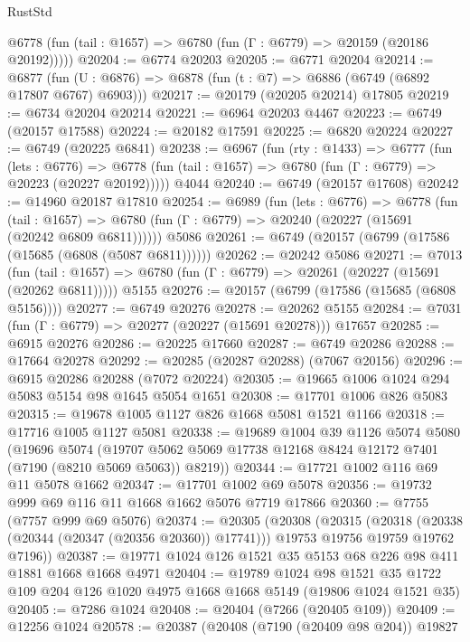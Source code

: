 \begin{lexlean}{RustStd}
\begin{coremodule}
      @6778 (fun (tail : @1657) => @6780 (fun (Γ : @6779) => @20159 (@20186 @20192)))))
@20204 := @6774 @20203
@20205 := @6771 @20204
@20214 := @6877
    (fun (U : @6876) => @6878 (fun (t : @7) => @6886 (@6749 (@6892 @17807 @6767) @6903)))
@20217 := @20179 (@20205 @20214) @17805
@20219 := @6734 @20204 @20214
@20221 := @6964 @20203 @4467
@20223 := @6749 (@20157 @17588)
@20224 := @20182 @17591
@20225 := @6820 @20224
@20227 := @6749 (@20225 @6841)
@20238 := @6967
    (fun (rty : @1433) =>
    @6777
      (fun (lets : @6776) =>
      @6778 (fun (tail : @1657) => @6780 (fun (Γ : @6779) => @20223 (@20227 @20192)))))
    @4044
@20240 := @6749 (@20157 @17608)
@20242 := @14960 @20187 @17810
@20254 := @6989
    (fun (lets : @6776) =>
    @6778
      (fun (tail : @1657) =>
      @6780 (fun (Γ : @6779) => @20240 (@20227 (@15691 (@20242 @6809 @6811))))))
    @5086
@20261 := @6749 (@20157 (@6799 (@17586 (@15685 (@6808 (@5087 @6811))))))
@20262 := @20242 @5086
@20271 := @7013
    (fun (tail : @1657) => @6780 (fun (Γ : @6779) => @20261 (@20227 (@15691 (@20262 @6811)))))
    @5155
@20276 := @20157 (@6799 (@17586 (@15685 (@6808 @5156))))
@20277 := @6749 @20276
@20278 := @20262 @5155
@20284 := @7031 (fun (Γ : @6779) => @20277 (@20227 (@15691 @20278))) @17657
@20285 := @6915 @20276
@20286 := @20225 @17660
@20287 := @6749 @20286
@20288 := @17664 @20278
@20292 := @20285 (@20287 @20288) (@7067 @20156)
@20296 := @6915 @20286 @20288 (@7072 @20224)
@20305 := @19665 @1006 @1024 @294 @5083 @5154 @98 @1645 @5054 @1651
@20308 := @17701 @1006 @826 @5083
@20315 := @19678 @1005 @1127 @826 @1668 @5081 @1521 @1166
@20318 := @17716 @1005 @1127 @5081
@20338 := @19689
    @1004
    @39
    @1126
    @5074
    @5080
    (@19696
      @5074
      (@19707 @5062 @5069 @17738 @12168 @8424 @12172 @7401 (@7190 (@8210 @5069 @5063)) @8219))
@20344 := @17721 @1002 @116 @69 @11 @5078 @1662
@20347 := @17701 @1002 @69 @5078
@20356 := @19732 @999 @69 @116 @11 @1668 @1662 @5076 @7719 @17866
@20360 := @7755 (@7757 @999 @69 @5076)
@20374 := @20305
    (@20308
      (@20315
        (@20318 (@20338 (@20344 (@20347 (@20356 @20360)) @17741)))
        @19753
        @19756
        @19759
        @19762
        @7196))
@20387 := @19771 @1024 @126 @1521 @35 @5153 @68 @226 @98 @411 @1881 @1668 @1668 @4971
@20404 := @19789
    @1024
    @98
    @1521
    @35
    @1722
    @109
    @204
    @126
    @1020
    @4975
    @1668
    @1668
    @5149
    (@19806 @1024 @1521 @35)
@20405 := @7286 @1024
@20408 := @20404 (@7266 (@20405 @109))
@20409 := @12256 @1024
@20578 := @20387
    (@20408
      (@7190 (@20409 @98 @204))
      @19827

\end{coremodule}
\end{lexlean}
